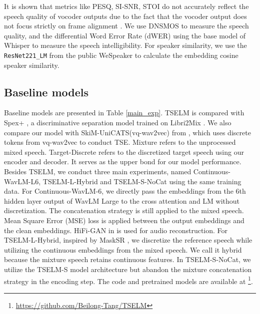 \documentclass[conference]{IEEEtran}
\begin{document}
It is shown that metrics like PESQ, SI-SNR, STOI do not accurately reflect the speech quality of 
vocoder outputs due to the fact that the vocoder output does not focus strictly on frame alignment
\cite{tokensplit,selm}. We use DNSMOS \cite{dnsmos} to measure the speech quality, and the differential 
Word Error 
Rate (dWER) \cite{dwer} using the base model of Whisper \cite{whisper} to measure the speech intelligibility. For speaker similarity, we use the \texttt{ResNet221\_LM}
from the public WeSpeaker \cite{wespeaker} to calculate the embedding cosine speaker similarity.


\subsection{Baseline models}
Baseline models are presented in Table \ref{main_exp}. 
TSELM is compared with Spex+ \cite{spex_plus}, a discriminative separation model trained on Libri2Mix \cite{librimix}. 
We also compare our model with SkiM-UniCATS(vq-wav2vec) from \cite{gen_tse}, which uses discrete tokens from vq-wav2vec to conduct TSE. 
Mixture refers to the unprocessed mixed speech. 
Target-Discrete refers to the discretized target speech using our encoder and decoder. 
It serves as the upper bond for our model performance.  Besides TSELM, we conduct three main experiments, named
 Continuous-WavLM-L6, TSELM-L-Hybrid and TSELM-S-NoCat using the same training data. 
For Continuous-WavLM-6, we directly
pass the embeddings from the 6th hidden layer output of WavLM Large to the cross attention  
and LM without discretization. 
The concatenation strategy is still applied to the mixed speech. Mean Square Error (MSE) loss is applied between the output embeddings and the clean 
embeddings. HiFi-GAN in \cite{knn_vc} is used for audio reconstruction. For 
TSELM-L-Hybrid, inspired by MaskSR \cite{mask_sr}, we discretize the reference 
speech while utilizing the continuous embeddings from the mixed speech. We call 
it hybrid because the mixture speech retains continuous features. In TSELM-S-NoCat, we utilize the TSELM-S model architecture but abandon the mixture concatenation strategy in the encoding step. The code and pretrained models are available at \footnote{\href{https://github.com/Beilong-Tang/TSELM}{https://github.com/Beilong-Tang/TSELM}}.
\end{document}
